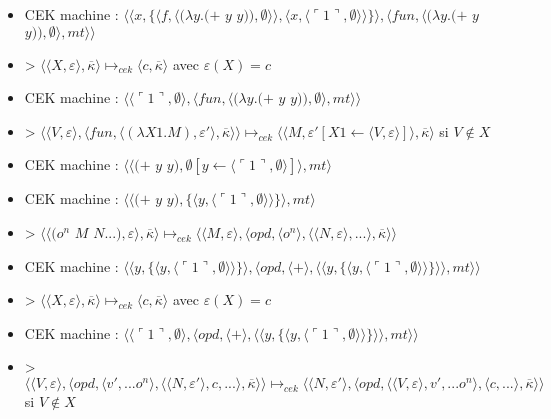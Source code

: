 \documentclass[10pt,a4paper]{article}
\begin{document}
\begin{itemize}
						\item[] CEK machine : $\langle\langle x,\{\langle f,\langle(\lambda y.(+$ $y$ $y)),\emptyset\rangle\rangle,\langle x,\langle\ulcorner 1\urcorner,\emptyset\rangle\rangle\}\rangle,\langle fun,\langle(\lambda y.(+$ $y$ $y)),\emptyset\rangle,mt\rangle\rangle$	
						\item[] > $\langle\langle X,\varepsilon\rangle,\overline{\kappa}\rangle \longmapsto_{cek} \langle c,\overline{\kappa}\rangle$ avec $\varepsilon(X) = c$
						\item[] CEK machine : $\langle \langle\ulcorner 1\urcorner,\emptyset\rangle,\langle fun,\langle(\lambda y.(+$ $y$ $y)),\emptyset\rangle,mt\rangle\rangle$	
						\item[] > $\langle\langle V,\varepsilon\rangle,\langle fun,\langle (\lambda X1.M),\varepsilon'\rangle,\overline{\kappa} \rangle \rangle \longmapsto_{cek} \langle \langle M,\varepsilon'[X1 \leftarrow \langle V,\varepsilon\rangle]\rangle,\overline{\kappa}\rangle$ si $V \notin X$
						\item[] CEK machine : $\langle\langle(+$ $y$ $y),\emptyset[y \leftarrow\langle\ulcorner 1\urcorner,\emptyset\rangle]\rangle ,mt\rangle$
						\item[] CEK machine : $\langle\langle(+$ $y$ $y),\{\langle y,\langle\ulcorner 1\urcorner,\emptyset\rangle\rangle\}\rangle ,mt\rangle$
						\item[] > $\langle\langle(o^{n}$ $M$ $N...),\varepsilon\rangle,\overline{\kappa}\rangle \longmapsto_{cek} \langle \langle M,\varepsilon\rangle,\langle opd,\langle o^{n}\rangle,\langle \langle N,\varepsilon\rangle,...\rangle,\overline{\kappa}\rangle\rangle$
						\item[] CEK machine : $\langle\langle y,\{\langle y,\langle\ulcorner 1\urcorner,\emptyset\rangle\rangle\}\rangle ,\langle opd,\langle+\rangle,\langle\langle y,\{\langle y,\langle\ulcorner 1\urcorner,\emptyset\rangle\rangle\}\rangle\rangle,mt\rangle\rangle$
						\item[] > $\langle\langle X,\varepsilon\rangle,\overline{\kappa}\rangle \longmapsto_{cek} \langle c,\overline{\kappa}\rangle$ avec $\varepsilon(X) = c$
						\item[] CEK machine : $\langle\langle\ulcorner 1\urcorner,\emptyset\rangle,\langle opd,\langle+\rangle,\langle\langle y,\{\langle y,\langle\ulcorner 1\urcorner,\emptyset\rangle\rangle\}\rangle\rangle,mt\rangle\rangle$
						\item[] > $\langle \langle V,\varepsilon\rangle,\langle opd,\langle v',...o^{n}\rangle,\langle  \langle N,\varepsilon'\rangle,c,...\rangle,\overline{\kappa}\rangle\rangle \longmapsto_{cek} \langle \langle N,\varepsilon'\rangle,\langle opd,\langle  \langle V,\varepsilon\rangle,v',...o^{n}\rangle,\langle c,...\rangle,\overline{\kappa}\rangle\rangle$ si $V \notin X$

\end{itemize}
\end{document}
